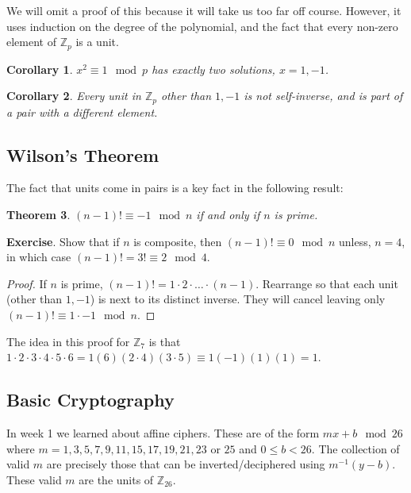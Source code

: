 \documentclass[11pt]{article}
\newtheorem{thm}{Theorem}
\newtheorem{cor}[thm]{Corollary}
\theoremstyle{definition}
\numberwithin{thm}{section}
\begin{document}
We will omit a proof of this because it will take us too far off course. However, it uses induction on the degree of the polynomial, and the fact that every non-zero element of $\mathbb{Z}_p$ is a unit.

\begin{cor} $x^2 \equiv 1 \mod p$ has exactly two solutions, $x=1,-1$.
\end{cor}

\begin{cor} Every unit in $\mathbb{Z}_p$ other than $1,-1$ is not self-inverse, and is part of a pair with a different element.
\end{cor}

\subsection{Wilson's Theorem}

The fact that units come in pairs is a key fact in the following result:

\begin{thm} $(n-1)! \equiv -1 \mod n$ if and only if $n$ is prime.
\end{thm}

\textbf{Exercise}. Show that if $n$ is composite, then $(n-1)! \equiv 0 \mod n$ unless, $n=4$, in which case $(n-1)! = 3! \equiv 2 \mod 4$.

\begin{proof} If $n$ is prime, $(n-1)! = 1 \cdot 2 \cdot \ldots \cdot (n-1)$. Rearrange so that each unit (other than $1,-1$) is next to its distinct inverse. They will cancel leaving only $(n-1)! \equiv 1 \cdot -1 \mod n$.
\end{proof}

The idea in this proof for $\mathbb{Z}_7$ is that $1 \cdot 2 \cdot 3 \cdot 4 \cdot 5 \cdot 6 = 1 (6)(2 \cdot 4) (3 \cdot 5) \equiv 1 (-1)(1)(1) = 1$.

\subsection{Basic Cryptography}

In week 1 we learned about affine ciphers. These are of the form $mx + b \mod 26$ where $m = 1,3,5,7,9,11,15,17,19,21,23$ or $25$ and $0 \leq b < 26$. The collection of valid $m$ are precisely those that can be inverted/deciphered using $m^{-1}(y-b)$. These valid $m$ are the units of $\mathbb{Z}_{26}$.
\end{document}
